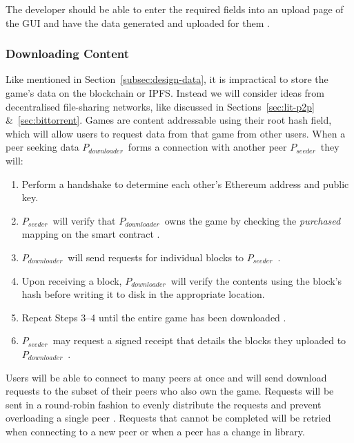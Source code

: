 \vspace{2mm}\noindent
The developer should be able to enter the required fields into an upload page of the GUI and have the data generated and uploaded for them .

\subsubsection*{Downloading Content}

\newcommand{\seeder}{$P_{seeder}$~}
\newcommand{\downloader}{$P_{downloader}$~}

Like mentioned in Section~\ref{subsec:design-data}, it is impractical to store the game's data on the blockchain or IPFS. Instead we will consider ideas from decentralised file-sharing networks, like discussed in Sections~\ref{sec:lit-p2p} \&~\ref{sec:bittorrent}.
\x
Games are content addressable using their root hash field, which will allow users to request data from that game from other users. When a peer seeking data \downloader forms a connection with another peer \seeder they will:

\begin{enumerate}
  \item Perform a handshake to determine each other's Ethereum address and public key.
  \item \seeder will verify that \downloader owns the game by checking the \textit{purchased} mapping on the smart contract  .
  \item \downloader will send requests for individual blocks to \seeder {}.
  \item Upon receiving a block, \downloader will verify the contents using the block's hash  before writing it to disk in the appropriate location.
  \item Repeat Steps 3--4 until the entire game has been downloaded .
  \item \seeder may request a signed receipt that details the blocks they uploaded  to \downloader.
\end{enumerate}

\vspace{2mm}\noindent
Users will be able to connect to many peers at once  and will send download requests to the subset of their peers who also own the game. Requests will be sent in a round-robin fashion to evenly distribute the requests and prevent overloading a single peer . Requests that cannot be completed will be retried when connecting to a new peer or when a peer has a change in library.

